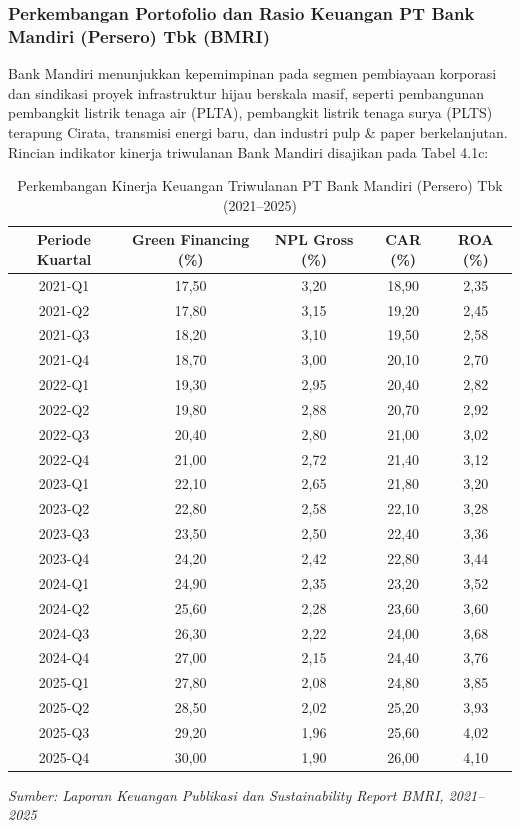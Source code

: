 \documentclass[12pt,a4paper]{article}
\numberwithin{equation}{section}
\begin{document}
\subsubsection{Perkembangan Portofolio dan Rasio Keuangan PT Bank Mandiri (Persero) Tbk (BMRI)}
\noindent
Bank Mandiri menunjukkan kepemimpinan pada segmen pembiayaan korporasi dan sindikasi proyek infrastruktur hijau berskala masif, seperti pembangunan pembangkit listrik tenaga air (PLTA), pembangkit listrik tenaga surya (PLTS) terapung Cirata, transmisi energi baru, dan industri pulp \& paper berkelanjutan. Rincian indikator kinerja triwulanan Bank Mandiri disajikan pada Tabel 4.1c:

\begin{table}[H]
  \caption{Perkembangan Kinerja Keuangan Triwulanan PT Bank Mandiri (Persero) Tbk (2021--2025)}
  \label{tab:kinerja_bmri}
  \small
  \begin{tabularx}{\textwidth}{|c|c|c|c|c|}
    \hline
    \textbf{Periode Kuartal} & \textbf{Green Financing (\%)} & \textbf{NPL Gross (\%)} & \textbf{CAR (\%)} & \textbf{ROA (\%)} \\
    \hline
    2021-Q1 & 17,50 & 3,20 & 18,90 & 2,35 \\
    2021-Q2 & 17,80 & 3,15 & 19,20 & 2,45 \\
    2021-Q3 & 18,20 & 3,10 & 19,50 & 2,58 \\
    2021-Q4 & 18,70 & 3,00 & 20,10 & 2,70 \\
    \hline
    2022-Q1 & 19,30 & 2,95 & 20,40 & 2,82 \\
    2022-Q2 & 19,80 & 2,88 & 20,70 & 2,92 \\
    2022-Q3 & 20,40 & 2,80 & 21,00 & 3,02 \\
    2022-Q4 & 21,00 & 2,72 & 21,40 & 3,12 \\
    \hline
    2023-Q1 & 22,10 & 2,65 & 21,80 & 3,20 \\
    2023-Q2 & 22,80 & 2,58 & 22,10 & 3,28 \\
    2023-Q3 & 23,50 & 2,50 & 22,40 & 3,36 \\
    2023-Q4 & 24,20 & 2,42 & 22,80 & 3,44 \\
    \hline
    2024-Q1 & 24,90 & 2,35 & 23,20 & 3,52 \\
    2024-Q2 & 25,60 & 2,28 & 23,60 & 3,60 \\
    2024-Q3 & 26,30 & 2,22 & 24,00 & 3,68 \\
    2024-Q4 & 27,00 & 2,15 & 24,40 & 3,76 \\
    \hline
    2025-Q1 & 27,80 & 2,08 & 24,80 & 3,85 \\
    2025-Q2 & 28,50 & 2,02 & 25,20 & 3,93 \\
    2025-Q3 & 29,20 & 1,96 & 25,60 & 4,02 \\
    2025-Q4 & 30,00 & 1,90 & 26,00 & 4,10 \\
    \hline
  \end{tabularx}
  \begin{flushleft}
    \textit{Sumber: Laporan Keuangan Publikasi dan Sustainability Report BMRI, 2021--2025}
  \end{flushleft}
\end{table}
\end{document}
